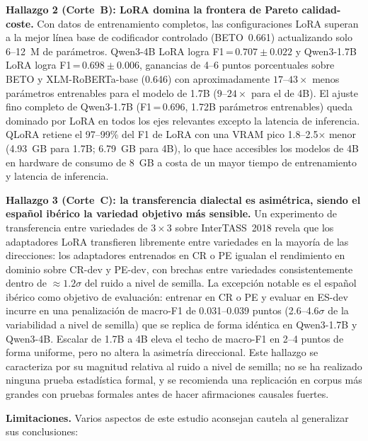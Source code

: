 \documentclass[conference]{IEEEtran}
\begin{document}
\textbf{Hallazgo 2 (Corte~B): LoRA domina la frontera de Pareto calidad-coste.}
Con datos de entrenamiento completos, las configuraciones LoRA superan a la mejor
línea base de codificador controlado (BETO~0.661) actualizando solo 6--12~M de
parámetros.
Qwen3-4B LoRA logra F1\,=\,$0.707 \pm 0.022$ y Qwen3-1.7B LoRA logra
F1\,=\,$0.698 \pm 0.006$, ganancias de 4--6 puntos porcentuales sobre BETO y
XLM-RoBERTa-base (0.646) con aproximadamente $17$--$43\times$ menos parámetros
entrenables para el modelo de 1.7B ($9$--$24\times$ para el de 4B).
El ajuste fino completo de Qwen3-1.7B (F1\,=\,0.696, 1.72B parámetros entrenables)
queda dominado por LoRA en todos los ejes relevantes excepto la latencia de
inferencia.
QLoRA retiene el 97--99\% del F1 de LoRA con una VRAM pico 1.8--2.5$\times$ menor
(4.93~GB para 1.7B; 6.79~GB para 4B), lo que hace accesibles los modelos de 4B en
hardware de consumo de 8~GB a costa de un mayor tiempo de entrenamiento y
latencia de inferencia.

\textbf{Hallazgo 3 (Corte~C): la transferencia dialectal es asimétrica, siendo el
español ibérico la variedad objetivo más sensible.}
Un experimento de transferencia entre variedades de $3\times3$ sobre
InterTASS~2018 revela que los adaptadores LoRA transfieren libremente entre
variedades en la mayoría de las direcciones: los adaptadores entrenados en CR o
PE igualan el rendimiento en dominio sobre CR-dev y PE-dev, con brechas entre
variedades consistentemente dentro de $\approx1.2\sigma$ del ruido a nivel de
semilla.
La excepción notable es el español ibérico como objetivo de evaluación:
entrenar en CR o PE y evaluar en ES-dev incurre en una penalización de macro-F1
de 0.031--0.039 puntos (2.6--4.6$\sigma$ de la variabilidad a nivel de semilla)
que se replica de forma idéntica en Qwen3-1.7B y Qwen3-4B.
Escalar de 1.7B a 4B eleva el techo de macro-F1 en 2--4 puntos de forma uniforme,
pero no altera la asimetría direccional.
Este hallazgo se caracteriza por su magnitud relativa al ruido a nivel de
semilla; no se ha realizado ninguna prueba estadística formal, y se recomienda
una replicación en corpus más grandes con pruebas formales antes de hacer
afirmaciones causales fuertes.

\textbf{Limitaciones.}
Varios aspectos de este estudio aconsejan cautela al generalizar sus
conclusiones:
\end{document}

